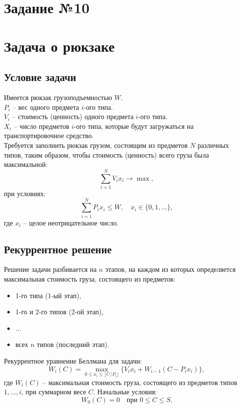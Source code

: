 \documentclass{article}
\begin{document}

\newpage
\section{Задание №10}
\section*{Задача о рюкзаке}

\subsection*{Условие задачи}

Имеется рюкзак грузоподъемностью $W$. \\
$P_i$ -- вес одного предмета $i$-ого типа. \\
$V_i$ -- стоимость (ценность) одного предмета $i$-ого типа. \\
$X_i$ -- число предметов $i$-ого типа, которые будут загружаться на транспортировочное средство. \\

Требуется заполнить рюкзак грузом, состоящим из предметов $N$ различных типов, таким образом, чтобы стоимость (ценность) всего груза была максимальной:
\[
    \sum_{i=1}^N V_i x_i \to \max,
\]
при условиях:
\[
    \sum_{i=1}^N P_i x_i \leq W, \quad x_i \in \{0, 1, \dots\},
\]
где $x_i$ -- целое неотрицательное число.

\subsection*{Рекуррентное решение}
Решение задачи разбивается на $n$ этапов, на каждом из которых определяется максимальная стоимость груза, состоящего из предметов:
\begin{itemize}
    \item 1-го типа (1-ый этап),
    \item 1-го и 2-го типов (2-ой этап),
    \item $\dots$
    \item всех $n$ типов (последний этап).
\end{itemize}

Рекуррентное уравнение Беллмана для задачи:
\[
    W_i(C) = \max_{0 \leq x_i \leq \lfloor C / P_i \rfloor} \{ V_i x_i + W_{i-1}(C - P_i x_i) \},
\]
где $W_i(C)$ -- максимальная стоимость груза, состоящего из предметов типов $1, \dots, i$, при суммарном весе $C$. Начальные условия:
\[
    W_0(C) = 0 \quad \text{при $0 \leq C \leq S$}.
\]
\end{document}
